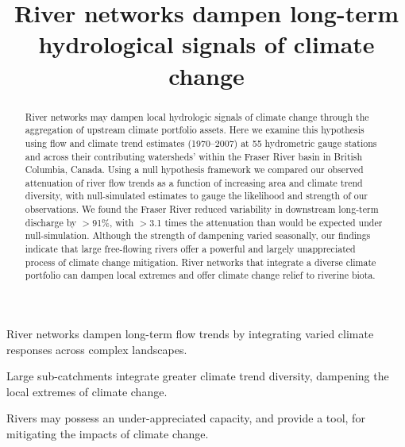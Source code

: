 \documentclass[draft,linenumbers]{AGUJournal}
\begin{document}

\title{River networks dampen long-term hydrological signals of climate change}







\begin{keypoints}
\item River networks dampen long-term flow trends by integrating varied climate responses across complex landscapes.
\item Large sub-catchments integrate greater climate trend diversity, dampening the local extremes of climate change.
\item Rivers may possess an under-appreciated capacity, and provide a tool, for mitigating the impacts of climate change.
\end{keypoints}


\begin{abstract}
	River networks may dampen local hydrologic signals of climate change through the aggregation of upstream climate portfolio assets. Here we examine this hypothesis using flow and climate trend estimates (1970--2007) at 55 hydrometric gauge stations and across their contributing watersheds' within the Fraser River basin in British Columbia, Canada. Using a null hypothesis framework we compared our observed attenuation of river flow trends as a function of increasing area and climate trend diversity, with null-simulated estimates to gauge the likelihood and strength of our observations. We found the Fraser River reduced variability in downstream long-term discharge by $>$91\%, with $>$3.1 times the attenuation than would be expected under null-simulation. Although the strength of dampening varied seasonally, our findings indicate that large free-flowing rivers offer a powerful and largely unappreciated process of climate change mitigation. River networks that integrate a diverse climate portfolio can dampen local extremes and offer climate change relief to riverine biota.
\end{abstract}
\end{document}
